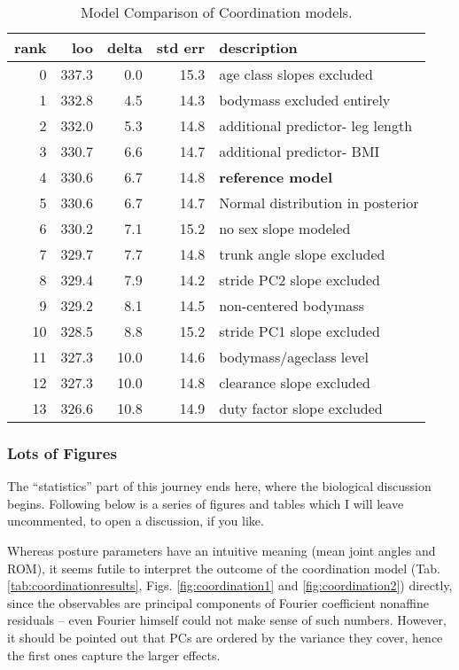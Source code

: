 \begin{table}[p]
\caption{\label{tab:coordinationmodelcomparison}Model Comparison of Coordination models.}
\centering
\begin{tabular}{rrrrl}
\textbf{rank} & \textbf{loo} & \textbf{delta} & \textbf{std err} & \textbf{description}\\[0pt]
\hline
0 & 337.3 & 0.0 & 15.3 & age class slopes excluded\\[0pt]
1 & 332.8 & 4.5 & 14.3 & bodymass excluded entirely\\[0pt]
2 & 332.0 & 5.3 & 14.8 & additional predictor- leg length\\[0pt]
3 & 330.7 & 6.6 & 14.7 & additional predictor- BMI\\[0pt]
4 & 330.6 & 6.7 & 14.8 & \textbf{reference model}\\[0pt]
5 & 330.6 & 6.7 & 14.7 & Normal distribution in posterior\\[0pt]
6 & 330.2 & 7.1 & 15.2 & no sex slope modeled\\[0pt]
7 & 329.7 & 7.7 & 14.8 & trunk angle slope excluded\\[0pt]
8 & 329.4 & 7.9 & 14.2 & stride PC2 slope excluded\\[0pt]
9 & 329.2 & 8.1 & 14.5 & non-centered bodymass\\[0pt]
10 & 328.5 & 8.8 & 15.2 & stride PC1 slope excluded\\[0pt]
11 & 327.3 & 10.0 & 14.6 & bodymass/ageclass level\\[0pt]
12 & 327.3 & 10.0 & 14.8 & clearance slope excluded\\[0pt]
13 & 326.6 & 10.8 & 14.9 & duty factor slope excluded\\[0pt]
\end{tabular}
\end{table}


\clearpage
\subsubsection{Lots of Figures}
\label{sec:org00d6433}
The ``statistics'' part of this journey ends here, where the biological discussion begins.
Following below is a series of figures and tables which I will leave uncommented, to open a discussion, if you like.

Whereas posture parameters have an intuitive meaning (mean joint angles and ROM), it seems futile to interpret the outcome of the coordination model (Tab. \ref{tab:coordinationresults}, Figs. \ref{fig:coordination1} and \ref{fig:coordination2}) directly, since the observables are principal components of Fourier coefficient nonaffine residuals -- even Fourier himself could not make sense of such numbers.
However, it should be pointed out that PCs are ordered by the variance they cover, hence the first ones capture the larger effects.

